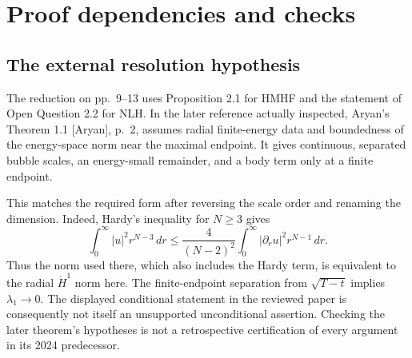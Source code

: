 \documentclass[10pt]{article}
\begin{document}
\section*{Proof dependencies and checks}
\subsection*{The external resolution hypothesis}
The reduction on pp. 9–13 uses Proposition 2.1 for HMHF and the statement of Open Question 2.2 for NLH. In the later reference actually inspected, Aryan’s Theorem 1.1 [Aryan], p. 2, assumes radial finite-energy data and boundedness of the energy-space norm near the maximal endpoint. It gives continuous, separated bubble scales, an energy-small remainder, and a body term only at a finite endpoint.\par
This matches the required form after reversing the scale order and renaming the dimension. Indeed, Hardy’s inequality for \(N\geq3\) gives \[\int_0^\infty |u|^2r^{N-3}\,dr
 \leq \frac{4}{(N-2)^2}
       \int_0^\infty |\partial_ru|^2r^{N-1}\,dr.\] Thus the norm used there, which also includes the Hardy term, is equivalent to the radial \(\dot H^1\) norm here. The finite-endpoint separation from \(\sqrt{T-t}\) implies \(\lambda_1\to0\). The displayed conditional statement in the reviewed paper is consequently not itself an unsupported unconditional assertion. Checking the later theorem’s hypotheses is not a retrospective certification of every argument in its 2024 predecessor.\par
\end{document}
